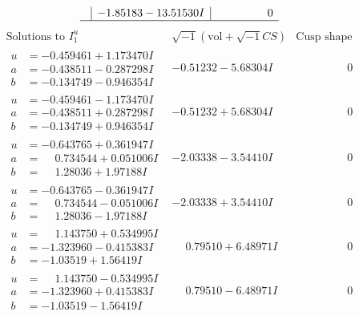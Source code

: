 \documentclass[1p]{elsarticle_modified}
\theoremstyle{definition}
\newcommand{\I}{\sqrt{-1}}
\begin{document}
$$\begin{array}{c|c|c}
 & -1.85183 - 13.51530 I & \phantom{-0.000000 } 0\\
 \hline 
 \end{array}$$\newpage$$\begin{array}{c|c|c}  
\text{Solutions to }I^u_{1}& \I (\text{vol} + \sqrt{-1}CS) & \text{Cusp shape}\\
 \hline 
\begin{aligned}
u &= -0.459461 + 1.173470 I \\
a &= -0.438511 - 0.287298 I \\
b &= -0.134749 - 0.946354 I\end{aligned}
 & -0.51232 - 5.68304 I & \phantom{-0.000000 } 0 \\ \hline\begin{aligned}
u &= -0.459461 - 1.173470 I \\
a &= -0.438511 + 0.287298 I \\
b &= -0.134749 + 0.946354 I\end{aligned}
 & -0.51232 + 5.68304 I & \phantom{-0.000000 } 0 \\ \hline\begin{aligned}
u &= -0.643765 + 0.361947 I \\
a &= \phantom{-}0.734544 + 0.051006 I \\
b &= \phantom{-}1.28036 + 1.97188 I\end{aligned}
 & -2.03338 - 3.54410 I & \phantom{-0.000000 } 0 \\ \hline\begin{aligned}
u &= -0.643765 - 0.361947 I \\
a &= \phantom{-}0.734544 - 0.051006 I \\
b &= \phantom{-}1.28036 - 1.97188 I\end{aligned}
 & -2.03338 + 3.54410 I & \phantom{-0.000000 } 0 \\ \hline\begin{aligned}
u &= \phantom{-}1.143750 + 0.534995 I \\
a &= -1.323960 - 0.415383 I \\
b &= -1.03519 + 1.56419 I\end{aligned}
 & \phantom{-}0.79510 + 6.48971 I & \phantom{-0.000000 } 0 \\ \hline\begin{aligned}
u &= \phantom{-}1.143750 - 0.534995 I \\
a &= -1.323960 + 0.415383 I \\
b &= -1.03519 - 1.56419 I\end{aligned}
 & \phantom{-}0.79510 - 6.48971 I & \phantom{-0.000000 } 0 \\ \hline\begin{aligned}

\end{aligned}
\end{array}$$
\end{document}
